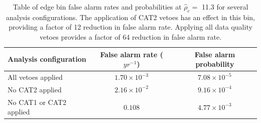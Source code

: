 \begin{table}[!ht]%
  \begin{center}
    \begin{tabular}{lcc}
      \hline
      Analysis configuration & False alarm rate ($yr^{-1}$) & False alarm probability \\ \hline
      All vetoes applied & $1.70\times10^{-3}$  & $7.08\times10^{-5}$ \\
      No CAT2 applied & $2.16\times10^{-2}$ & $9.16\times10^{-4}$ \\
      No CAT1 or CAT2 applied & $0.108$ & $4.77\times10^{-3}$ \\ \hline
    \end{tabular}
  \end{center}
  \caption[Edge bin FAR - GW151226 analysis]{Table of edge bin false alarm rates and probabilities at $\hat{\rho}_{c} =$ 11.3 %
           for several analysis configurations. The application of CAT2 vetoes %
           has an effect in this bin, providing a factor of 12 reduction in false %
           alarm rate. Applying all data quality vetoes provides a factor of 64 %
           reduction in false alarm rate.}
  \label{table:151226-edge-far}
\end{table}



